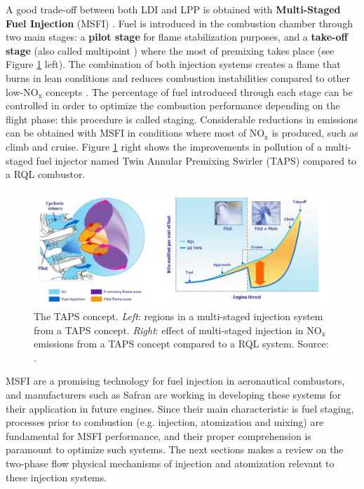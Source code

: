 A good trade-off between both LDI and LPP is obtained with \textbf{Multi-Staged Fuel Injection} (MSFI) . Fuel is introduced in the combustion chamber through two main stages: a \textbf{pilot stage} for flame stabilization purposes, and a \textbf{take-off stage} (also called multipoint ) where the most of premixing takes place (see Figure \ref{fig:foust_TAPS} left). The combination of both injection systems creates a flame that burns in lean conditions and reduces combustion instabilities compared to other low-NO$_\mathrm{x}$ concepts . The percentage of fuel introduced through each stage can be controlled in order to optimize the combustion performance depending on the flight phase: this procedure is called staging. Considerable reductions in emissions can be obtained with MSFI in conditions where most of NO$_\mathrm{x}$ is produced, such as climb and cruise. Figure \ref{fig:foust_TAPS} right shows the improvements in pollution of a multi-staged fuel injector named Twin Annular Premixing Swirler (TAPS)  compared to a RQL combustor.

\begin{figure}[h!]
	\centering
	\includegraphics[scale=0.6]{./part0_intro/foust_TAPS}
	\caption[The TAPS concept]{The TAPS concept. \textsl{Left}: regions in a multi-staged injection system from a TAPS concept. \textsl{Right}: effect of multi-staged injection in NO$_\mathrm{x}$ emissions from a TAPS concept compared to a RQL system. Source: .}
	\label{fig:foust_TAPS}
\end{figure}

MSFI are a promising technology for fuel injection in aeronautical combustors, and manufacturers such as Safran are working in developing these systems for their application in future engines. Since their main characteristic is fuel staging, processes prior to combustion (e.g. injection, atomization and mixing) are fundamental for MSFI performance, and their proper comprehension is paramount to optimize such systems. The next sections makes a review on the two-phase flow physical mechanisms of injection and atomization relevant to these injection systems.


